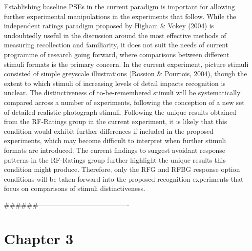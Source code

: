\documentclass[
  11pt,
]{article}
\begin{document}
Establishing baseline PSEs in the current paradigm is important for
allowing further experimental manipulations in the experiments that
follow. While the independent ratings paradigm proposed by Higham \&
Vokey (2004) is undoubtedly useful in the discussion around the most
effective methods of measuring recollection and familiarity, it does not
suit the needs of current programme of research going forward, where
comparisons between different stimuli formats is the primary concern. In
the current experiment, picture stimuli consisted of simple greyscale
illustrations (Rossion \& Pourtois, 2004), though the extent to which
stimuli of increasing levels of detail impacts recognition is unclear.
The distinctiveness of to-be-remembered stimuli will be systematically
compared across a number of experiments, following the conception of a
new set of detailed realistic photograph stimuli. Following the unique
results obtained from the RF-Ratings group in the current experiment, it
is likely that this condition would exhibit further differences if
included in the proposed experiments, which may become difficult to
interpret when further stimuli formats are introduced. The current
findings to suggest avoidant response patterns in the RF-Ratings group
further highlight the unique results this condition might produce.
Therefore, only the RFG and RFBG response option conditions will be
taken forward into the proposed recognition experiments that focus on
comparisons of stimuli distinctiveness.

\#\#\#\#\#\#----------------------------------------

\newpage

\hypertarget{chapter-3}{%
\section{Chapter 3}\label{chapter-3}}
\end{document}
